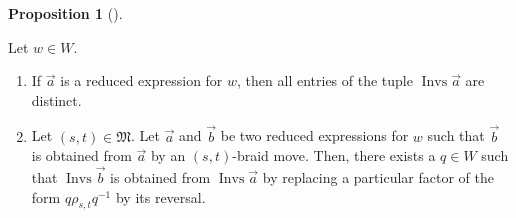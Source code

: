 \documentclass
[numbers=enddot,12pt,final,onecolumn,notitlepage,abstracton]{scrartcl}%
\theoremstyle{definition}
\newtheorem{prop}[theo]{Proposition}
\newenvironment{proposition}[1][]
{\begin{prop}[#1]\begin{leftbar}}
{\end{leftbar}\end{prop}}
\begin{document}
\begin{proposition}
\label{prop.Invsles}Let $w\in W$.

\begin{enumerate}
\item[\textbf{(a)}] If $\overrightarrow{a}$ is a reduced expression for $w$,
then all entries of the tuple $\operatorname*{Invs}\overrightarrow{a}$ are distinct.

\item[\textbf{(b)}] Let $\left(  s,t\right)  \in\mathfrak{M}$. Let
$\overrightarrow{a}$ and $\overrightarrow{b}$ be two reduced expressions for
$w$ such that $\overrightarrow{b}$ is obtained from $\overrightarrow{a}$ by an
$\left(  s,t\right)  $-braid move. Then, there exists a $q\in W$ such that
$\operatorname*{Invs}\overrightarrow{b}$ is obtained from
$\operatorname*{Invs}\overrightarrow{a}$ by replacing a particular factor of
the form $q\rho_{s,t}q^{-1}$ by its reversal\footnotemark.
\end{enumerate}
\end{proposition}

\end{document}
